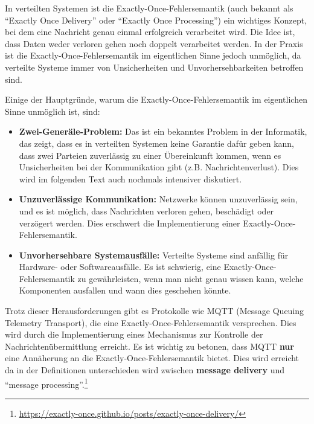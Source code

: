 \documentclass[../vs-script-first-v01.tex]{subfiles}
\begin{document}
In verteilten Systemen ist die Exactly-Once-Fehlersemantik (auch bekannt als \enquote{Exactly Once Delivery} oder \enquote{Exactly Once Processing}) ein wichtiges Konzept, bei dem eine Nachricht genau einmal erfolgreich verarbeitet wird. Die Idee ist, dass Daten weder verloren gehen noch doppelt verarbeitet werden. In der Praxis ist die Exactly-Once-Fehlersemantik im eigentlichen Sinne jedoch unmöglich, da verteilte Systeme immer von Unsicherheiten und Unvorhersehbarkeiten betroffen sind.

Einige der Hauptgründe, warum die Exactly-Once-Fehlersemantik im eigentlichen Sinne unmöglich ist, sind:
\begin{itemize}
\item \textbf{Zwei-Generäle-Problem:} Das ist ein bekanntes Problem in der Informatik, das zeigt, dass es in verteilten Systemen keine Garantie dafür geben kann, dass zwei Parteien zuverlässig zu einer Übereinkunft kommen, wenn es Unsicherheiten bei der Kommunikation gibt (z.B. Nachrichtenverlust). Dies wird im folgenden Text auch nochmals intensiver diskutiert.
\item \textbf{Unzuverlässige Kommunikation:} Netzwerke können unzuverlässig sein, und es ist möglich, dass Nachrichten verloren gehen, beschädigt oder verzögert werden. Dies erschwert die Implementierung einer Exactly-Once-Fehlersemantik.
\item \textbf{Unvorhersehbare Systemausfälle:} Verteilte Systeme sind anfällig für Hardware- oder Softwareausfälle. Es ist schwierig, eine Exactly-Once-Fehlersemantik zu gewährleisten, wenn man nicht genau wissen kann, welche Komponenten ausfallen und wann dies geschehen könnte.
\end{itemize}
Trotz dieser Herausforderungen gibt es Protokolle wie MQTT (Message Queuing Telemetry Transport), die eine Exactly-Once-Fehlersemantik versprechen. Dies wird durch die Implementierung eines Mechanismus zur Kontrolle der Nachrichtenübermittlung erreicht. Es ist wichtig zu betonen, dass MQTT \textbf{nur} eine Annäherung an die Exactly-Once-Fehlersemantik bietet. Dies wird erreicht da in der Definitionen unterschieden wird zwischen  \textbf{message delivery} und \enquote{message processing}.\footnote{\url{https://exactly-once.github.io/posts/exactly-once-delivery/}}
\end{document}
